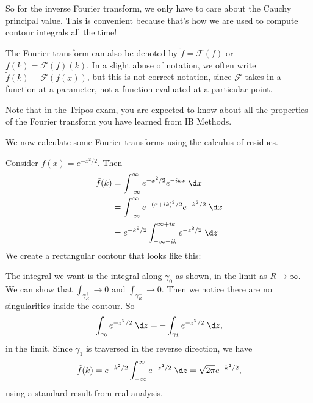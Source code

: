 \documentclass[a4paper]{article}
\begin{document}
So for the inverse Fourier transform, we only have to care about the Cauchy principal value. This is convenient because that's how we are used to compute contour integrals all the time!

\begin{notation}
  The Fourier transform can also be denoted by $\tilde{f} = \mathcal{F}(f)$ or $\tilde{f}(k) = \mathcal{F}(f)(k)$. In a slight abuse of notation, we often write $\tilde{f}(k) = \mathcal{F}(f(x))$, but this is not correct notation, since $\mathcal{F}$ takes in a function at a parameter, not a function evaluated at a particular point.
\end{notation}

Note that in the Tripos exam, you are expected to know about all the properties of the Fourier transform you have learned from IB Methods.

We now calculate some Fourier transforms using the calculus of residues.
\begin{eg}
  Consider $f(x) = e^{-x^2/2}$. Then
  \begin{align*}
    \tilde{f}(k) &= \int_{-\infty}^\infty e^{-x^2/2} e^{-ikx}\;\d x\\
    &= \int_{-\infty}^\infty e^{-(x + ik)^2/2} e^{-k^2/2}\;\d x\\
    &= e^{-k^2/2}\int_{-\infty + ik}^{\infty + ik} e^{-z^2/2}\;\d z
  \end{align*}
  We create a rectangular contour that looks like this:
  \begin{center}
  \end{center}
  The integral we want is the integral along $\gamma_0$ as shown, in the limit as $R \to \infty$. We can show that $\int_{\gamma_R^+} \to 0$ and $\int_{\gamma_R^-} \to 0$. Then we notice there are no singularities inside the contour. So
  \[
    \int_{\gamma_0} e^{-z^2/2}\;\d z = -\int_{\gamma_1} e^{-z^2/2}\;\d z,
  \]
  in the limit. Since $\gamma_1$ is traversed in the reverse direction, we have
  \[
    \tilde{f}(k) = e^{-k^2/2} \int_{-\infty}^\infty e^{-z^2/2}\;\d z = \sqrt{2\pi} e^{-k^2/2},
  \]
  using a standard result from real analysis.
\end{eg}
\end{document}
